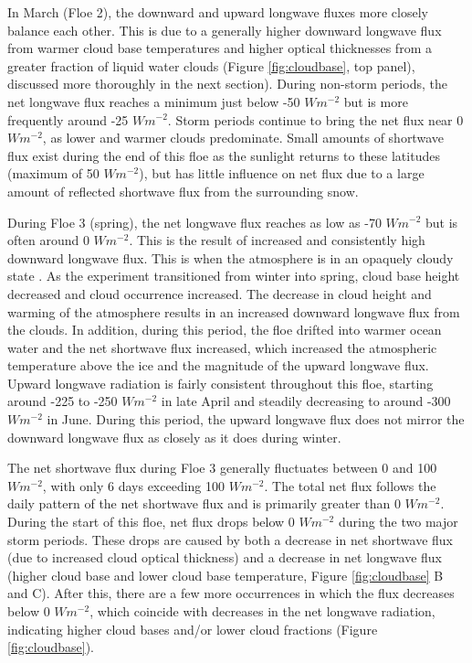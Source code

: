 In March (Floe 2), the downward and upward longwave fluxes more closely balance each other. This is due to a generally higher downward longwave flux from warmer cloud base temperatures and higher optical thicknesses from a greater fraction of liquid water clouds (Figure \ref{fig:cloudbase}, top panel), discussed more thoroughly in the next section). During non-storm periods, the net longwave flux reaches a minimum just below -50 $Wm^{-2}$ but is more frequently around -25 $Wm^{-2}$. Storm periods continue to bring the net flux near 0 $Wm^{-2}$, as lower and warmer clouds predominate. Small amounts of shortwave flux exist during the end of this floe as the sunlight returns to these latitudes (maximum of 50 $Wm^{-2}$), but has little influence on net flux due to a large amount of reflected shortwave flux from the surrounding snow.

During Floe 3 (spring), the net longwave flux reaches as low as -70 $Wm^{-2}$ but is often around 0 $Wm^{-2}$. This is the result of increased and consistently high downward longwave flux. This is when the atmosphere is in an opaquely cloudy state \citep{stramler:2011 graham:2017}. As the experiment transitioned from winter into spring, cloud base height decreased and cloud occurrence increased. The decrease in cloud height and warming of the atmosphere results in an increased downward longwave flux from the clouds. In addition, during this period, the floe drifted into warmer ocean water \citep{kayser:2017} and the net shortwave flux increased, which increased the atmospheric temperature above the ice and the magnitude of the upward longwave flux. Upward longwave radiation is fairly consistent throughout this floe, starting around -225 to -250 $Wm^{-2}$ in late April and steadily decreasing to around -300 $Wm^{-2}$ in June. During this period, the upward longwave flux does not mirror the downward longwave flux as closely as it does during winter.

The net shortwave flux during Floe 3 generally fluctuates between 0 and 100 $Wm^{-2}$, with only 6 days exceeding 100 $Wm^{-2}$. The total net flux follows the daily pattern of the net shortwave flux and is primarily greater than 0 $Wm^{-2}$. During the start of this floe, net flux drops below 0 $Wm^{-2}$ during the two major storm periods. These drops are caused by both a decrease in net shortwave flux (due to increased cloud optical thickness) and a decrease in net longwave flux (higher cloud base and lower cloud base temperature, Figure \ref{fig:cloudbase} B and C). After this, there are a few more occurrences in which the flux decreases below 0 $Wm^{-2}$, which coincide with decreases in the net longwave radiation, indicating higher cloud bases and/or lower cloud fractions (Figure \ref{fig:cloudbase}).  

